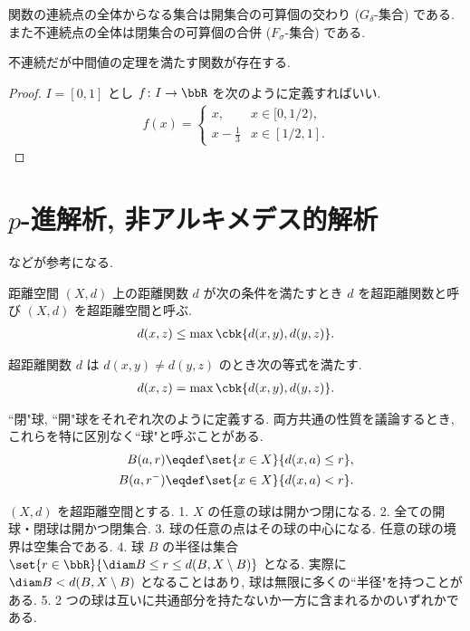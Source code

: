 \documentclass[openany, a4paper, oneside]{jsbook}
\begin{document}
\begin{prop}
関数の連続点の全体からなる集合は開集合の可算個の交わり ($G_{\delta}$-集合) である.
また不連続点の全体は閉集合の可算個の合併 ($F_{\sigma}$-集合) である.
\end{prop}

\begin{ex}
不連続だが中間値の定理を満たす関数が存在する.
\end{ex}
\begin{proof}
$I = [0, 1]$ とし $f \colon I \to \bbR$ を次のように定義すればいい.
\begin{align}
 f(x)
 =
 \begin{cases}
  x, & x \in [0, 1/2), \\
  x - \frac{1}{3} & x \in [1/2, 1].
 \end{cases}
\end{align}
\end{proof}
\section{$p$-進解析, 非アルキメデス的解析}

\cite{Kenkichiiwasawa1, WHSchikhof1} などが参考になる.
\begin{defn}
距離空間 $(X, d)$ 上の距離関数 $d$ が次の条件を満たすとき
$d$ を超距離関数と呼び $(X, d)$ を超距離空間と呼ぶ.
\begin{align}
 d(x, z)
 \leq
 \max \cbk{d(x,y), d(y,z)}.
\end{align}
\end{defn}
超距離関数 $d$ は $d(x,y) \neq d(y,z)$ のとき次の等式を満たす.
\begin{align}
 d(x, z)
 =
 \max \cbk{d(x,y), d(y,z)}.
\end{align}

``閉"球, ``開"球をそれぞれ次のように定義する.
両方共通の性質を議論するとき, これらを特に区別なく``球"と呼ぶことがある.
\begin{align}
 B(a,r)
 &\eqdef
 \set{x \in X}{d(x, a) \leq r}, \\
 B(a, r^{-})
 &\eqdef
 \set{x \in X}{d(x, a) < r}.
\end{align}
\begin{prop}
$(X, d)$ を超距離空間とする.
1. $X$ の任意の球は開かつ閉になる.
2. 全ての開球・閉球は開かつ閉集合.
3. 球の任意の点はその球の中心になる.
   任意の球の境界は空集合である.
4. 球 $B$ の半径は集合 $\set{r \in \bbR}{\diam B \leq r \leq d(B, X \setminus B)}$ となる.
   実際に $\diam B < d(B, X \setminus B)$ となることはあり, 球は無限に多くの``半径"を持つことがある.
5. 2 つの球は互いに共通部分を持たないか一方に含まれるかのいずれかである.
\end{prop}
\end{document}
